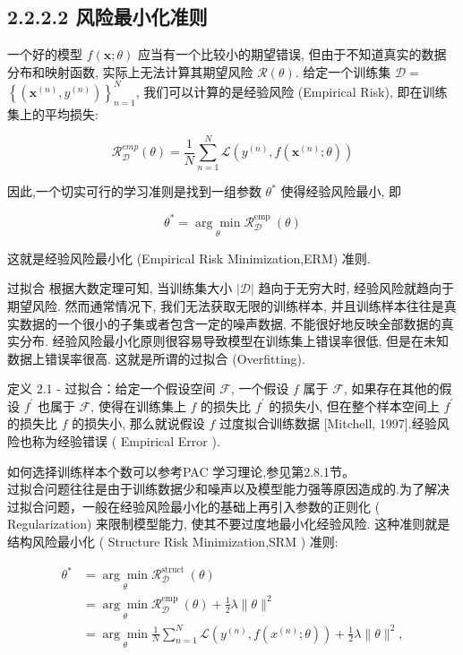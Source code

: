 \documentclass[10pt]{article}
\begin{document}
\subsection*{2.2.2.2 风险最小化准则}
一个好的模型 $f(\boldsymbol{x} ; \theta)$ 应当有一个比较小的期望错误, 但由于不知道真实的数据分布和映射函数, 实际上无法计算其期望风险 $\mathcal{R}(\theta)$. 给定一个训练集 $\mathcal{D}=$ $\left\{\left(\boldsymbol{x}^{(n)}, y^{(n)}\right)\right\}_{n=1}^{N}$, 我们可以计算的是经验风险 (Empirical Risk), 即在训练集上的平均损失:


\begin{equation*}
\mathcal{R}_{\mathcal{D}}^{e m p}(\theta)=\frac{1}{N} \sum_{n=1}^{N} \mathcal{L}\left(y^{(n)}, f\left(\boldsymbol{x}^{(n)} ; \theta\right)\right) \tag{2.22}
\end{equation*}


因此,一个切实可行的学习准则是找到一组参数 $\theta^{*}$ 使得经验风险最小, 即


\begin{equation*}
\theta^{*}=\underset{\theta}{\arg \min } \mathcal{R}_{\mathcal{D}}^{\text {emp }}(\theta) \tag{2.23}
\end{equation*}


这就是经验风险最小化 (Empirical Risk Minimization,ERM) 准则.

过拟合 根据大数定理可知, 当训练集大小 $|\mathcal{D}|$ 趋向于无穷大时, 经验风险就趋向于期望风险. 然而通常情况下, 我们无法获取无限的训练样本, 并且训练样本往往是真实数据的一个很小的子集或者包含一定的噪声数据, 不能很好地反映全部数据的真实分布. 经验风险最小化原则很容易导致模型在训练集上错误率很低, 但是在未知数据上错误率很高. 这就是所谓的过拟合 (Overfitting).

定义 2.1 - 过拟合：给定一个假设空间 $\mathcal{F}$, 一个假设 $f$ 属于 $\mathcal{F}$, 如果存在其他的假设 $f^{\prime}$ 也属于 $\mathcal{F}$, 使得在训练集上 $f$ 的损失比 $f^{\prime}$ 的损失小, 但在整个样本空间上 $f^{\prime}$ 的损失比 $f$ 的损失小, 那么就说假设 $f$ 过度拟合训练数据 [Mitchell, 1997].经验风险也称为经验错误 ( Empirical Error ).

如何选择训练样本个数可以参考PAC 学习理论,参见第2.8.1节。\\
过拟合问题往往是由于训练数据少和噪声以及模型能力强等原因造成的.为了解决过拟合问题，一般在经验风险最小化的基础上再引入参数的正则化 ( Regularization) 来限制模型能力, 使其不要过度地最小化经验风险. 这种准则就是结构风险最小化 ( Structure Risk Minimization,SRM ) 准则:


\begin{align*}
\theta^{*} & =\underset{\theta}{\arg \min } \mathcal{R}_{\mathcal{D}}^{\text {struct }}(\theta)  \tag{2.24}\\
& =\underset{\theta}{\arg \min } \mathcal{R}_{\mathcal{D}}^{\text {emp }}(\theta)+\frac{1}{2} \lambda\|\theta\|^{2}  \tag{2.25}\\
& =\underset{\theta}{\arg \min } \frac{1}{N} \sum_{n=1}^{N} \mathcal{L}\left(y^{(n)}, f\left(x^{(n)} ; \theta\right)\right)+\frac{1}{2} \lambda\|\theta\|^{2}, \tag{2.26}
\end{align*}
\end{document}
